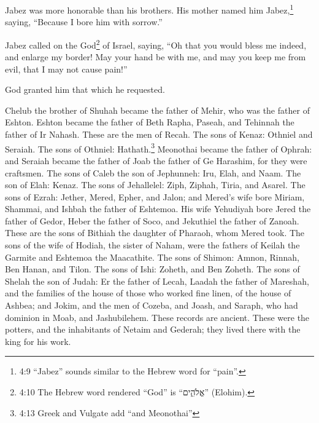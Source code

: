 \myverse{}Jabez was more honorable than his brothers. His mother named him
Jabez,\footnote{4:9 “Jabez” sounds similar to the Hebrew word for “pain”.} saying, “Because I bore him with
sorrow.”

\myverse{}Jabez called on the God\footnote{4:10 The Hebrew word rendered “God” is “אֱלֹהִ֑ים” (Elohim).} of Israel, saying,
“Oh that you would bless me indeed, and enlarge my border! May your hand be with me, and may you keep
me from evil, that I may not cause pain!”

God granted him that which he requested.

\myverse{}Chelub the brother of Shuhah became the father of Mehir, who
was the father of Eshton.
\myverse{}Eshton became the father of Beth Rapha, Paseah, and Tehinnah the father of
Ir Nahash. These are the men of Recah.
\myverse{}The sons of Kenaz: Othniel and Seraiah. The sons of Othniel: Hathath.\footnote{4:13 Greek and Vulgate add “and Meonothai”}
\myverse{}Meonothai became the father of Ophrah: and Seraiah became the father of Joab
the father of Ge Harashim, for they were craftsmen.
\myverse{}The sons of Caleb the son of Jephunneh: Iru, Elah, and Naam. The son of Elah:
Kenaz.
\myverse{}The sons of Jehallelel: Ziph, Ziphah, Tiria, and Asarel.
\myverse{}The sons of Ezrah: Jether, Mered, Epher, and Jalon; and Mered’s wife bore
Miriam, Shammai, and Ishbah the father of Eshtemoa.
\myverse{}His wife Yehudiyah bore Jered the father of Gedor, Heber the father of Soco,
and Jekuthiel the father of Zanoah. These are the sons of Bithiah the daughter of Pharaoh, whom Mered
took.
\myverse{}The sons of the wife of Hodiah, the sister of Naham, were the fathers of Keilah
the Garmite and Eshtemoa the Maacathite.
\myverse{}The sons of Shimon: Amnon, Rinnah, Ben Hanan, and Tilon. The sons of Ishi:
Zoheth, and Ben Zoheth.
\myverse{}The sons of Shelah the son of Judah: Er the father of Lecah, Laadah the father
of Mareshah, and the families of the house of those who worked fine linen, of the house of Ashbea;
\myverse{}and Jokim, and the men of Cozeba, and Joash, and Saraph, who had dominion
in Moab, and Jashubilehem. These records are ancient.
\myverse{}These were the potters, and the inhabitants of Netaim and Gederah; they lived
there with the king for his work.

